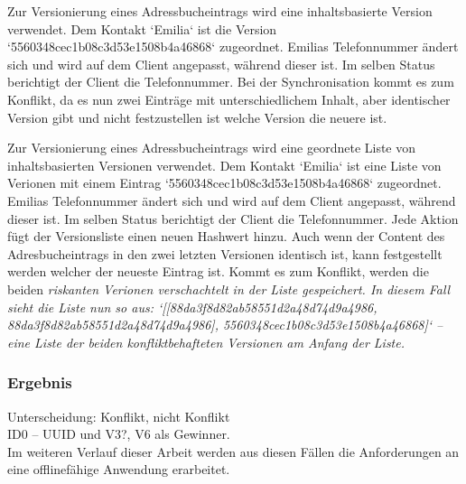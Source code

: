 \begin{description}[leftmargin=0.5cm,style=nextline]
  \item[Szenario V5:]%
  Zur Versionierung eines Adressbucheintrags wird eine inhaltsbasierte Version verwendet. Dem Kontakt `Emilia` ist die Version `5560348cec1b08c3d53e1508b4a46868` zugeordnet. Emilias Telefonnummer ändert sich und wird auf dem Client angepasst, während dieser  ist. Im selben Status berichtigt der Client die Telefonnummer. Bei der Synchronisation kommt es zum Konflikt, da es nun zwei Einträge mit unterschiedlichem Inhalt, aber identischer Version gibt und nicht festzustellen ist welche Version die neuere ist.\\
  \item[Szenario V6:] %
  Zur Versionierung eines Adressbucheintrags wird eine geordnete Liste von inhaltsbasierten Versionen verwendet.
  Dem Kontakt `Emilia` ist eine Liste von Verionen mit einem Eintrag `5560348cec1b08c3d53e1508b4a46868` zugeordnet. Emilias Telefonnummer ändert sich und wird auf dem Client angepasst, während dieser  ist. Im selben Status berichtigt der Client die Telefonnummer. Jede Aktion fügt der Versionsliste einen neuen Hashwert hinzu. Auch wenn der Content des Adresbucheintrags in den zwei letzten Versionen identisch ist, kann festgestellt werden welcher der neueste Eintrag ist. Kommt es zum Konflikt, werden die beiden \it{riskanten} Verionen verschachtelt in der Liste gespeichert. In diesem Fall sieht die Liste nun so aus: `[[88da3f8d82ab58551d2a48d74d9a4986, 88da3f8d82ab58551d2a48d74d9a4986], 5560348cec1b08c3d53e1508b4a46868]` -- eine Liste der beiden konfliktbehafteten Versionen am Anfang der Liste.
\end{description}
%
%
\subsubsection*{Ergebnis}
Unterscheidung: Konflikt, nicht Konflikt\\
ID0 -- UUID und V3?, V6 als Gewinner.\\
Im weiteren Verlauf dieser Arbeit werden aus diesen Fällen die Anforderungen an eine offlinefähige Anwendung erarbeitet.